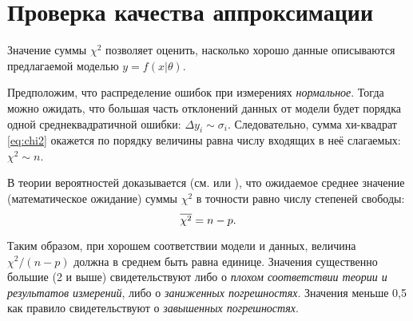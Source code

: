 %


\section{Проверка качества аппроксимации}

Значение суммы $\chi^2$ позволяет оценить, насколько хорошо данные описываются
предлагаемой моделью $y=f(x|\theta)$.

Предположим, что распределение ошибок при измерениях \emph{нормальное}.
Тогда можно ожидать, что большая часть отклонений данных от модели будет
порядка одной среднеквадратичной ошибки: $\Delta y_{i}\sim\sigma_{i}$.
Следовательно, сумма хи-квадрат \eqref{eq:chi2} окажется по порядку
величины равна числу входящих в неё слагаемых: $\chi^{2}\sim n$.


В теории вероятностей доказывается (см. \cite{hudson} или \cite{idie}),
что ожидаемое среднее значение (математическое ожидание) суммы $\chi^{2}$
в точности равно числу степеней свободы:
\[
\overline{\chi^{2}}=n-p.
\]

Таким образом, при хорошем соответствии модели и данных,
величина $\chi^2 / (n-p) $ должна в среднем быть равна единице.
Значения существенно большие (2 и выше) свидетельствуют либо о
\emph{плохом соответствии теории и результатов измерений},
    либо о \emph{заниженных погрешностях}.
    Значения меньше 0,5 как правило свидетельствуют о \emph{завышенных погрешностях}.


